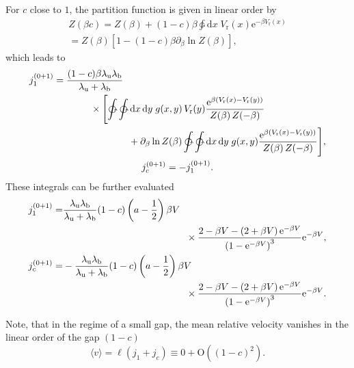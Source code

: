 \documentclass[aps,pre,twocolumn,showpacs,showkeys,superscriptaddress,floatfix]{revtex4-1}
\newcommand{\rmd}{{\mathrm d}}
\newcommand{\rme}{{\mathrm e}}
\begin{document}
For $c$ close to $1$, the partition function is given in linear order by
\begin{multline*}
Z(\beta c ) 
= Z(\beta) + (1-c) \beta \ointctrclockwise \rmd x \; V_\text{r}(x) \rme^{-\beta V_\text{r}(x) } 
\\
= Z(\beta) \left[ 1 - (1-c) \beta \partial_\beta \ln Z(\beta) \right] ,
\end{multline*}
which leads to 
\begin{gather*}
\begin{multlined}[c][.9\linewidth]
j_1^{(0+1)} = \frac{ (1-c) \beta \lambda_\text{u} \lambda_\text{b} }{ \lambda_\text{u} + \lambda_\text{b} }
\\ \times 
\Biggl[ \ointctrclockwise \ointctrclockwise \rmd x \, \rmd y \; g(x,y) \, V_\text{r}(y) \frac{ \rme^{ \beta ( V_\text{r}(x) -  V_\text{r}(y) ) } }{Z(\beta) \, Z(-\beta) } \\
+ \partial_\beta \ln Z(\beta) \ointctrclockwise \ointctrclockwise \rmd x \, \rmd y \; g(x,y) \frac{ \rme^{ \beta ( V_\text{r}(x) -  V_\text{r}(y) ) } }{Z(\beta) \, Z(-\beta) } \Biggr] ,
\end{multlined}
\\
j_c^{(0+1)} = - j_1^{(0+1)} . 
\end{gather*}
These integrals can be further evaluated 
\begin{align*}
j_1^{(0+1)} =& 
\begin{multlined}[t][.8\linewidth]
\frac{ \lambda_\text{u} \lambda_\text{b} }{ \lambda_\text{u} + \lambda_\text{b} } (1 - c ) \left(a - \frac{1}{2} \right)  \beta V  
\\\times 
\frac{ 2 - \beta V - \left( 2 + \beta V \right) \rme^{-\beta V} }{\left(1 - \rme^{-\beta V} \right)^3 } \rme^{-\beta V }, 
\end{multlined}\\
j_c^{(0+1)} =& 
\begin{multlined}[t][.8\linewidth]
- \frac{ \lambda_\text{u} \lambda_\text{b} }{ \lambda_\text{u} + \lambda_\text{b} } (1 - c ) \left(a - \frac{1}{2} \right)  \beta V 
\\\times 
\frac{ 2 - \beta V - \left( 2 + \beta V \right) \rme^{-\beta V} }{\left(1 - \rme^{-\beta V} \right)^3 } \rme^{-\beta V }.
\end{multlined}
\end{align*}

Note, that in the regime of a small gap, the mean relative velocity vanishes in the linear order of the gap $(1-c)$
\begin{equation*}
\langle v \rangle = \ell ( j_1 + j_c ) \equiv 0 + {\mathrm O}\left((1-c)^2\right).
\end{equation*}
\end{document}
